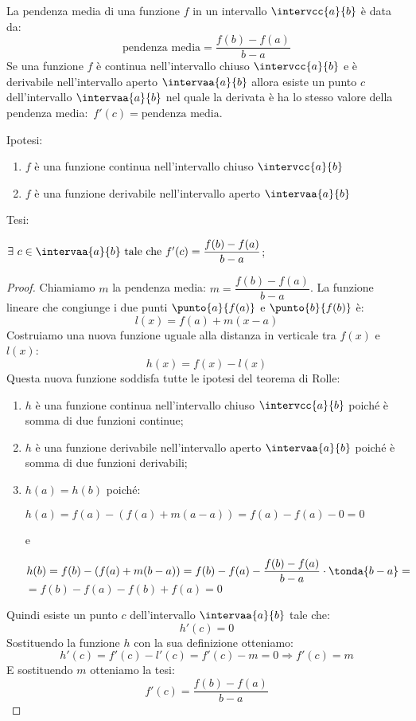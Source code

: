 \begin{teorema}
La pendenza media di una funzione \(f\) in un intervallo 
\(\intervcc{a}{b}\) è data da:
\[\text{pendenza media} = \frac{f(b)-f(a)}{b-a}\]
Se una funzione \(f\) è continua nell'intervallo chiuso \(\intervcc{a}{b}\) e
è derivabile nell'intervallo aperto \(\intervaa{a}{b}\) allora
esiste un punto \(c\) dell'intervallo \(\intervaa{a}{b}\) nel quale 
la derivata è ha lo stesso valore della 
pendenza media:~\(f'(c)=\text{pendenza media}\).
\end{teorema}

\noindent Ipotesi:
\begin{enumerate}[nosep]
 \item \(f\) è una funzione continua 
 nell'intervallo chiuso \(\intervcc{a}{b}\)
 \item \(f\) è una funzione derivabile 
 nell'intervallo aperto \(\intervaa{a}{b}\)
\end{enumerate}

\noindent Tesi: 

\(\exists~c \in \intervaa{a}{b}\text{ tale che }f'(c)=\dfrac{f(b)-f(a)}{b-a}\);

\begin{proof}
Chiamiamo \(m\) la pendenza media: \(m=\dfrac{f(b)-f(a)}{b-a}\). 
La funzione lineare che congiunge i due 
punti \(\punto{a}{f(a)}\) e \(\punto{b}{f(b)}\) è:
\[l(x) = f(a) + m(x-a)\]
Costruiamo una nuova funzione uguale alla distanza in verticale tra \(f(x)\) 
e \(l(x)\):
\[h(x) = f(x) - l(x)\]
Questa nuova funzione soddisfa tutte le ipotesi del teorema di Rolle:
\begin{enumerate}[nosep]
 \item \(h\) è una funzione continua 
 nell'intervallo chiuso \(\intervcc{a}{b}\)
 poiché è somma di due funzioni continue;
 \item \(h\) è una funzione derivabile 
 nell'intervallo aperto \(\intervaa{a}{b}\)
 poiché è somma di due funzioni derivabili;
 \item \(h(a)=h(b)\)  poiché:
 
 \(h(a)=f(a) - (f(a) + m(a-a))=f(a)-f(a)-0=0\)
 
 e 
 
 \(h(b)=f(b) - (f(a) + m(b-a))=
 f(b)-f(a)-\dfrac{f(b)-f(a)}{b-a}\cdot \tonda{b-a}=\)\\
 \(=f(b)-f(a)-f(b)+f(a)=0\)
\end{enumerate}
 
 Quindi esiste un punto \(c\) dell'intervallo \(\intervaa{a}{b}\) tale che:
 \[h'(c)=0\]
 Sostituendo la funzione \(h\) con la sua definizione otteniamo:
 \[h'(c) = f'(c)-l'(c)= f'(c)-m=0 \Rightarrow f'(c)=m\]
 E sostituendo \(m\) otteniamo la tesi:
 \[f'(c)=\dfrac{f(b)-f(a)}{b-a}\]
\end{proof}

